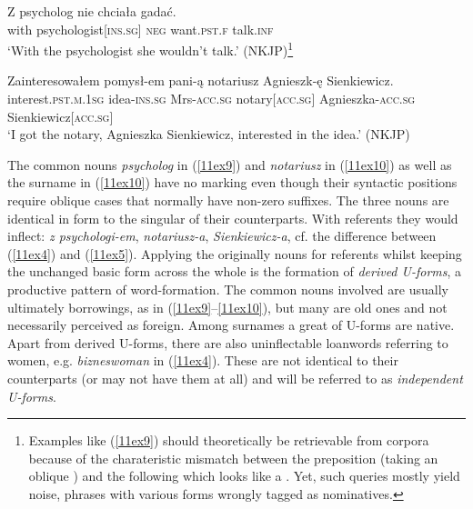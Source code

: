 \documentclass[output=paper,colorlinks,citecolor=brown]{langscibook}
\begin{document}
\begin{exe}
	\ex \label{11ex9}
	\gll Z psycholog nie chciała gadać. \\
	with psychologist[\textsc{ins.sg}] \textsc{neg} want.\textsc{pst.f} talk.\textsc{inf} \\
	\trans ‘With the psychologist she wouldn’t talk.’ \hfill (NKJP)\footnote{Examples like (\ref{11ex9}) should theoretically be retrievable from corpora because of the charateristic mismatch between the preposition (taking an oblique ) and the following  which looks like a . Yet, such queries mostly yield noise, phrases with various forms wrongly tagged as nominatives.}
	
	\ex \label{11ex10}
	\gll Zainteresowałem pomysł-em pani-ą notariusz Agnieszk-ę Sienkiewicz. \\
	interest.\textsc{pst.m.1sg} idea-\textsc{ins.sg} Mrs-\textsc{acc.sg} notary[\textsc{acc.sg}] Agnieszka-\textsc{acc.sg} Sienkiewicz[\textsc{acc.sg}] \\
	\trans `I got the notary, Agnieszka Sienkiewicz, interested in the idea.' \hfill (NKJP)
\end{exe}

{\sloppy The common nouns \emph{psycholog} in (\ref{11ex9}) and \emph{notariusz} in (\ref{11ex10}) as well as the surname in (\ref{11ex10}) have no marking even though their syntactic positions require oblique cases that normally have non-zero suffixes. The three nouns are identical in form to the  singular of their  counterparts. With  referents they would inflect: \emph{z psychologi-em}, \emph{notariusz-a}, \emph{Sienkiewicz-a}, cf. the difference between (\ref{11ex4}) and (\ref{11ex5}). Applying the originally  nouns for  referents whilst keeping the unchanged basic form across the whole  is the formation of \textit{derived U-forms}, a productive pattern of word-formation. The common nouns involved are usually ultimately borrowings, as in (\ref{11ex9}--\ref{11ex10}), but many are old ones and not necessarily perceived as foreign. Among surnames a great  of U-forms are native. Apart from derived U-forms, there are also uninflectable loanwords referring to women, e.g. \emph{bizneswoman} in (\ref{11ex4}). These are not identical to their  counterparts (or may not have them at all) and will be referred to as \textit{independent U-forms}.\par}
\end{document}
